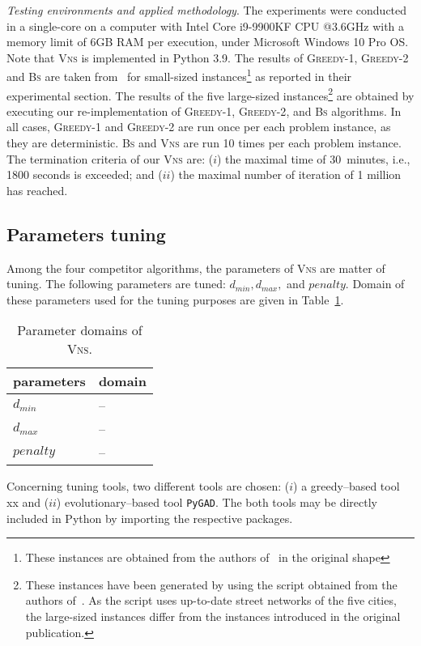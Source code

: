\documentclass[dvipsnames,format=sigconf,anonymous=true,review=true]{acmart}
\begin{document}
 \emph{Testing environments and applied methodology}. The experiments were conducted in a single-core on a computer with Intel Core i9-9900KF CPU @3.6GHz with a memory limit of 6GB RAM per execution, under Microsoft Windows 10 Pro OS. Note that \textsc{Vns}  is implemented in Python 3.9. The results of \textsc{Greedy-1}, \textsc{Greedy-2} and \textsc{Bs} are taken from~\cite{corcoran2021heuristics} for small-sized instances\footnote{These instances are obtained from the authors of~\cite{corcoran2021heuristics} in the original shape} as reported in their experimental section. The results of the  five large-sized instances\footnote{These instances have been generated by using the script obtained from the authors of~\cite{corcoran2021heuristics}. As the script uses up-to-date street networks of the five cities, the large-sized instances differ from the instances introduced in the original publication. } are obtained by executing our re-implementation of \textsc{Greedy-1}, \textsc{Greedy-2}, and \textsc{Bs} algorithms. In all cases, \textsc{Greedy-1} and \textsc{Greedy-2} are run once per each problem instance, as they are deterministic. \textsc{Bs} and \textsc{Vns} are run 10 times per each problem instance.  The termination criteria of our \textsc{Vns} are: ($i$) the maximal time of 30~minutes, i.e., 1800 seconds is exceeded; and ($ii$) the maximal number of iteration of 1 million has reached. 
\subsection{Parameters tuning}
   Among the four competitor algorithms, the parameters of \textsc{Vns} are matter of tuning. The following parameters are tuned: $d_{min}, d_{max},$ and  $penalty$. Domain of these parameters used for the tuning purposes are given in Table~\ref{tab:domain_tuning}.
   
    \begin{table}[ht]
   	\begin{tabular}{ll}
   		parameters      & domain \\ \hline
   	$d_{min}$ &  -- \\
   	$d_{max}$ &  -- \\
   	 $penalty$ & --  \\   \hline
   	\end{tabular}
   	\caption{Parameter domains of \textsc{Vns}.}  
   	   	\label{tab:domain_tuning}
   \end{table}
   
   Concerning tuning tools, two different tools are chosen: ($i$) a greedy--based tool xx and ($ii$) evolutionary--based tool \texttt{PyGAD}. The both tools may be directly included in Python by importing the respective packages.
   
\end{document}
